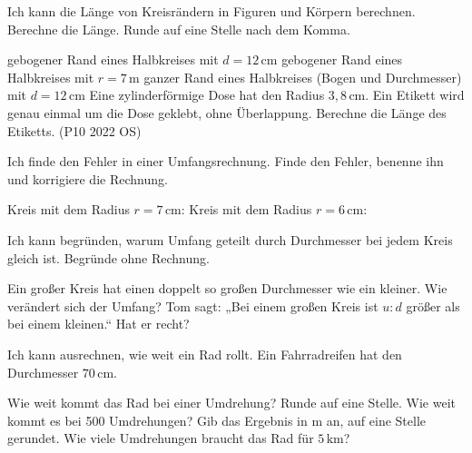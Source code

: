 \begin{aufgabe}{Ich kann die Länge von Kreisrändern in Figuren und Körpern berechnen.}
Berechne die Länge. Runde auf eine Stelle nach dem Komma.
\begin{teile}
\teil gebogener Rand eines Halbkreises mit $d = 12\,\text{cm}$ \hfill \leerfeld[cm]
\teil gebogener Rand eines Halbkreises mit $r = 7\,\text{m}$ \hfill \leerfeld[m]
\teil ganzer Rand eines Halbkreises (Bogen und Durchmesser) mit $d = 12\,\text{cm}$ \hfill \leerfeld[cm]
\teil Eine zylinderförmige Dose hat den Radius $3{,}8\,\text{cm}$. Ein Etikett wird genau einmal um die Dose geklebt, ohne Überlappung. Berechne die Länge des Etiketts. (P10 2022 OS) \hfill \leerfeld[cm]
\end{teile}


\end{aufgabe}

\begin{aufgabe}{Ich finde den Fehler in einer Umfangsrechnung.}
Finde den Fehler, benenne ihn und korrigiere die Rechnung.
\begin{teile}
\teil Kreis mit dem Radius $r = 7\,\text{cm}$: 
\teil Kreis mit dem Radius $r = 6\,\text{cm}$: 
\end{teile}
\end{aufgabe}

\begin{aufgabe}{Ich kann begründen, warum Umfang geteilt durch Durchmesser bei jedem Kreis gleich ist.}
Begründe ohne Rechnung.
\begin{teile}
\teil Ein großer Kreis hat einen doppelt so großen Durchmesser wie ein kleiner. Wie verändert sich der Umfang?
\teil Tom sagt: „Bei einem großen Kreis ist $u : d$ größer als bei einem kleinen.“ Hat er recht?
\end{teile}
\end{aufgabe}

\begin{aufgabe}{Ich kann ausrechnen, wie weit ein Rad rollt.}
Ein Fahrradreifen hat den Durchmesser $70\,\text{cm}$.
\begin{teile}
\teil Wie weit kommt das Rad bei einer Umdrehung? Runde auf eine Stelle. \hfill \leerfeld[cm]
\teil Wie weit kommt es bei 500 Umdrehungen? Gib das Ergebnis in m an, auf eine Stelle gerundet. \hfill \leerfeld[m]
\teil Wie viele Umdrehungen braucht das Rad für $5\,\text{km}$? \hfill \leerfeld
\end{teile}
\end{aufgabe}
